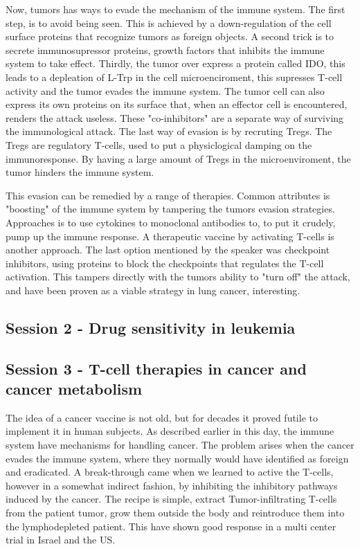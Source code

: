 \documentclass[12p]{article}
\begin{document}
Now, tumors has ways to evade the mechanism of the immune system.
The first step, is to avoid being seen.
This is achieved by a down-regulation of the cell surface proteins that recognize tumors as foreign objects.
A second trick is to secrete immunosupressor proteins, growth factors that inhibits the immune system to take effect.
Thirdly, the tumor over express a protein called IDO, this leads to a depleation of L-Trp in the cell microenciroment, this supresses T-cell activity and the tumor evades the immune system.
The tumor cell can also express its own proteins on its surface that, when an effector cell is encountered, renders the attack useless.
These "co-inhibitors" are a separate way of surviving the immunological attack.
The last way of evasion is by recruting Tregs.
The Tregs are regulatory T-cells, used to put a physiclogical damping on the immunoresponse.
By having a large amount of Tregs in the microenviroment, the tumor hinders the immune system.

This evasion can be remedied by a range of therapies.
Common attributes is "boosting" of the immune system by tampering the tumors evasion strategies.
Approaches is to use cytokines to  monoclonal antibodies to, to put it crudely, pump up the immune response.
A therapeutic vaccine by activating T-cells is another approach.
The last option mentioned by the speaker was checkpoint inhibitors, using proteins to block the checkpoints that regulates the T-cell activation.
This tampers directly with the tumors ability to "turn off" the attack, and have been proven as a viable strategy in lung cancer, interesting.


\subsection*{Session 2 - Drug sensitivity in leukemia}

\subsection*{Session 3 - T-cell therapies in cancer and cancer metabolism}

The idea of a cancer vaccine is not old, but for decades it proved futile to implement it in human subjects.
As described earlier in this day, the immune system have mechanisms for handling cancer.
The problem arises when the cancer evades the immune system, where they normally would have identified as foreign and eradicated.
A break-through came when we learned to active the T-cells, however in a somewhat indirect fashion, by inhibiting the inhibitory pathways induced by the cancer.
The recipe is simple, extract Tumor-infiltrating T-cells from the patient tumor, grow them outside the body and reintroduce them into the lymphodepleted patient.
This have shown good response in a multi center trial in Israel and the US.
\end{document}
